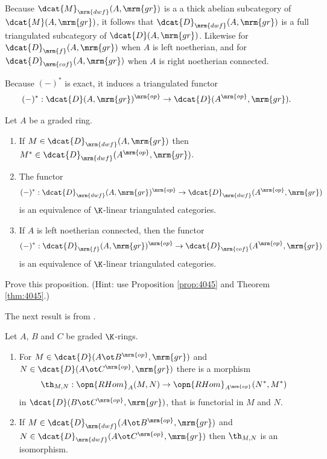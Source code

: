 Because $\dcat{M}_{\mrm{dwf}}(A, \mrm{gr})$ is a a thick abelian 
subcategory of $\dcat{M}(A, \mrm{gr})$,
it follows that $\dcat{D}_{\mrm{dwf}}(A, \mrm{gr})$
is a full triangulated subcategory of 
$\dcat{D}(A, \mrm{gr})$. Likewise for 
$\dcat{D}_{\mrm{f}}(A, \mrm{gr})$
when $A$ is left noetherian, and for 
$\dcat{D}_{\mrm{cof}}(A, \mrm{gr})$
when $A$ is right noetherian connected.

Because $(-)^*$ is exact, it induces a triangulated functor 
\begin{equation} \label{eqn:3733}
(-)^* : \dcat{D}(A, \mrm{gr})^{\mrm{op}} \to 
\dcat{D}(A^{\mrm{op}}, \mrm{gr}) . 
\end{equation}

\begin{prop} \label{prop:4591}   
Let $A$ be a graded ring.
\begin{enumerate}
\item If $M \in \dcat{D}_{\mrm{dwf}}(A, \mrm{gr})$ then 
$M^* \in \dcat{D}_{\mrm{dwf}}(A^{\mrm{op}}, \mrm{gr})$.

\item The functor 
\[ (-)^* : \dcat{D}_{\mrm{dwf}}(A, \mrm{gr})^{\mrm{op}} \to 
\dcat{D}_{\mrm{dwf}}(A^{\mrm{op}}, \mrm{gr}) \]
is an equivalence of $\K$-linear triangulated categories. 

\item If $A$ is left noetherian connected, then the functor 
\[ (-)^* : \dcat{D}_{\mrm{f}}(A, \mrm{gr})^{\mrm{op}} \to 
\dcat{D}_{\mrm{cof}}(A^{\mrm{op}}, \mrm{gr}) \]
is an equivalence of $\K$-linear triangulated categories. 
\end{enumerate}
\end{prop}

\begin{exer} \label{exer:3830}
Prove this proposition. (Hint: use Proposition \ref{prop:4045} and 
Theorem \ref{thm:4045}.) 
\end{exer} 

The next result is from \cite{VdB}. 

\begin{thm} \label{thm:3800} 
Let $A$, $B$ and $C$  be graded $\K$-rings. 
\begin{enumerate}
\item For 
$M \in \dcat{D}(A \ot B^{\mrm{op}}, \mrm{gr})$ and
$N \in \dcat{D}(A \ot C^{\mrm{op}}, \mrm{gr})$
there is a morphism 
\[ \th_{M, N} :  \opn{RHom}_A(M, N) \to \opn{RHom}_{A^{\mrm{op}}}(N^*, M^*) \]
in $\dcat{D}(B \ot C^{\mrm{op}}, \mrm{gr})$, that is functorial in $M$ and $N$.

\item If
$M \in \dcat{D}_{\mrm{dwf}}(A \ot B^{\mrm{op}}, \mrm{gr})$ 
and
$N \in \dcat{D}_{\mrm{dwf}}(A \ot C^{\mrm{op}}, \mrm{gr})$
then $\th_{M, N}$ is an isomorphism. 
\end{enumerate}
\end{thm}

